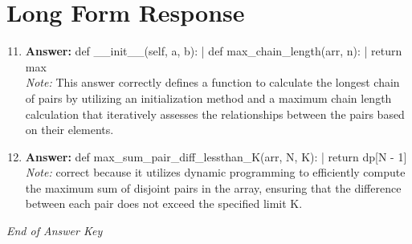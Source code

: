 \documentclass[12pt]{article}
\begin{document}
\section*{Long Form Response}
\begin{enumerate}[label=\arabic*.]
\setcounter{enumi}{10}
\item \textbf{Answer:} def \_\_init\_\_(self, a, b): | def max\_chain\_length(arr, n): | return max
\\ \textit{Note:} This answer correctly defines a function to calculate the longest chain of pairs by utilizing an initialization method and a maximum chain length calculation that iteratively assesses the relationships between the pairs based on their elements.
\item \textbf{Answer:} def max\_sum\_pair\_diff\_lessthan\_K(arr, N, K): | return dp[N - 1]
\\ \textit{Note:} correct because it utilizes dynamic programming to efficiently compute the maximum sum of disjoint pairs in the array, ensuring that the difference between each pair does not exceed the specified limit K.
\end{enumerate}

\vfill
\noindent\textit{End of Answer Key}
\end{document}
